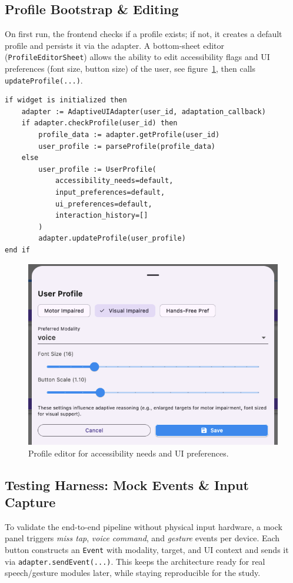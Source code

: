 \documentclass[openany]{book}
\begin{document}
\subsection{Profile Bootstrap \& Editing}
On first run, the frontend checks if a profile exists; if not, it creates a default profile and persists it via the adapter. A bottom-sheet editor (\texttt{ProfileEditorSheet}) allows the ability to edit accessibility flags and UI preferences (font size, button size) of the user, see figure~\ref{fig:fig_profile_editor}, then calls \texttt{updateProfile(...)}.

\begin{lstlisting}[basicstyle=\ttfamily\small, caption={Profile initialization logic}]
if widget is initialized then
    adapter := AdaptiveUIAdapter(user_id, adaptation_callback)
    if adapter.checkProfile(user_id) then
        profile_data := adapter.getProfile(user_id)
        user_profile := parseProfile(profile_data)
    else
        user_profile := UserProfile(
            accessibility_needs=default,
            input_preferences=default,
            ui_preferences=default,
            interaction_history=[]
        )
        adapter.updateProfile(user_profile)
end if
\end{lstlisting}

\begin{figure}[H]
\centering
\includegraphics[width=.6\linewidth]{images/fig_profile_editor.png}
\caption{Profile editor for accessibility needs and UI preferences.}
\label{fig:fig_profile_editor}
\end{figure}

\subsection{Testing Harness: Mock Events \& Input Capture}
To validate the end-to-end pipeline without physical input hardware, a mock panel triggers \emph{miss tap}, \emph{voice command}, and \emph{gesture} events per device. Each button constructs an \texttt{Event} with modality, target, and UI context and sends it via \texttt{adapter.sendEvent(...)}. This keeps the architecture ready for real speech/gesture modules later, while staying reproducible for the study.
\end{document}

